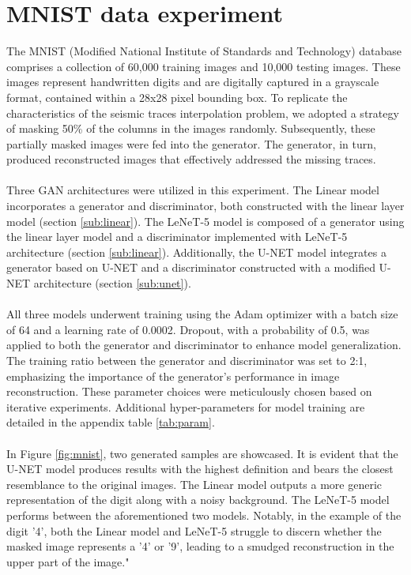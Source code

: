 \section{MNIST data experiment}
The MNIST (Modified National Institute of Standards and Technology) database comprises a collection of 60,000 training images and 10,000 testing images. These images represent handwritten digits and are digitally captured in a grayscale format, contained within a 28x28 pixel bounding box. \cite{deng2012mnist} To replicate the characteristics of the seismic traces interpolation problem, we adopted a strategy of masking 50\% of the columns in the images randomly. Subsequently, these partially masked images were fed into the generator. The generator, in turn, produced reconstructed images that effectively addressed the missing traces. 
\\\\
\noindent Three GAN architectures were utilized in this experiment. The Linear model incorporates a generator and discriminator, both constructed with the linear layer model (section \ref{sub:linear}). The LeNeT-5 model is composed of a generator using the linear layer model and a discriminator implemented with LeNeT-5 architecture (section \ref{sub:linear}). Additionally, the U-NET model integrates a generator based on U-NET and a discriminator constructed with a modified U-NET architecture (section \ref{sub:unet}).
\\\\
\noindent All three models underwent training using the Adam optimizer with a batch size of 64 and a learning rate of 0.0002. Dropout, with a probability of 0.5, was applied to both the generator and discriminator to enhance model generalization. The training ratio between the generator and discriminator was set to 2:1, emphasizing the importance of the generator's performance in image reconstruction. These parameter choices were meticulously chosen based on iterative experiments. Additional hyper-parameters for model training are detailed in the appendix table \ref{tab:param}.
\\\\
In Figure \ref{fig:mnist}, two generated samples are showcased. It is evident that the U-NET model produces results with the highest definition and bears the closest resemblance to the original images. The Linear model outputs a more generic representation of the digit along with a noisy background. The LeNeT-5 model performs between the aforementioned two models. Notably, in the example of the digit '4', both the Linear model and LeNeT-5 struggle to discern whether the masked image represents a '4' or '9', leading to a smudged reconstruction in the upper part of the image."

